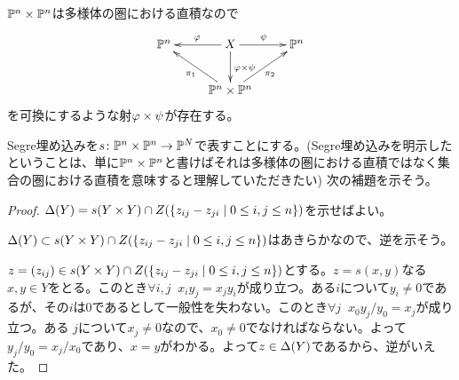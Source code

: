 

\begin{rem}
  ${\mathbb P}^n \times {\mathbb P}^n$は多様体の圏における直積なので
  \[
  \xymatrix{
  \P^n & X \ar[r]^{\psi} \ar[l]_{\vp} \ar[d]^{\vp \tm \psi} & \P^n \\
  {} & \P^n \tm \P^n \ar[ul]^{\pi_1} \ar[ur]_{\pi_2} & {}
  }
  \]
  を可換にするような射${\varphi} \times \psi$が存在する。
\end{rem}



\begin{rem}
  Segre埋め込みを$s \colon {\mathbb P}^n \times {\mathbb P}^n \to {\mathbb P}^N$で表すことにする。(Segre埋め込みを明示したということは、単に${\mathbb P}^n \times {\mathbb P}^n$と書けばそれは多様体の圏における直積ではなく集合の圏における直積を意味すると理解していただきたい) 次の補題を示そう。
\end{rem}

\begin{proof}
${\Delta}(Y) = s(Y \times Y) \cap Z(\left\{ z_{ij} - z_{ji}  \mathrel{} \middle| \mathrel{} 0 \leq i,j \leq n \right\})$を示せばよい。

${\Delta}(Y) \subset s(Y \times Y) \cap Z(\left\{ z_{ij} - z_{ji}  \mathrel{} \middle| \mathrel{} 0 \leq i,j \leq n \right\})$はあきらかなので、逆を示そう。

$z=(z_{ij}) \in s(Y \times Y) \cap Z(\left\{ z_{ij} - z_{ji}  \mathrel{} \middle| \mathrel{} 0 \leq i,j \leq n \right\})$とする。$z = s(x,y)$なる$x,y \in Y$をとる。このとき$\forall i,j \; \; x_i y_j = x_j y_i$が成り立つ。ある$i$について$y_i \neq 0$であるが、その$i$は$0$であるとして一般性を失わない。このとき$\forall j \; \; x_0 y_j / y_0 = x_j$が成り立つ。ある
$j$について$x_j \neq 0$なので、$x_0 \neq 0$でなければならない。よって$y_j / y_0 = x_j / x_0$であり、$x= y$がわかる。よって$z \in {\Delta}(Y)$であるから、逆がいえた。
\end{proof}




